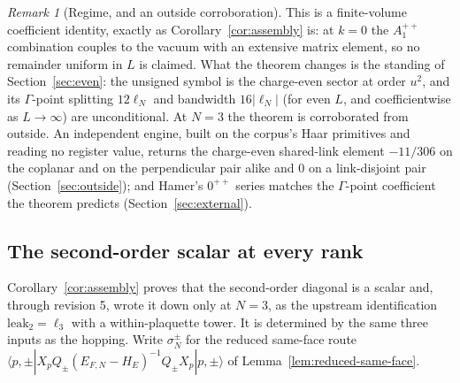 \documentclass[11pt]{article}
\theoremstyle{plain}
\theoremstyle{definition}
\theoremstyle{remark}
\newtheorem{remark}[theorem]{Remark}
\begin{document}
\begin{remark}[Regime, and an outside corroboration]
This is a finite-volume coefficient identity, exactly as
Corollary~\ref{cor:assembly} is: at $k=0$ the $A_1^{++}$ combination couples
to the vacuum with an extensive matrix element, so no remainder uniform in
$L$ is claimed. What the theorem changes is the standing of
Section~\ref{sec:even}: the unsigned symbol is the charge-even sector at
order $u^2$, and its $\Gamma$-point splitting $12\ell_N$ and bandwidth
$16|\ell_N|$ (for even $L$, and coefficientwise as $L\to\infty$) are
unconditional. At $N=3$ the theorem is corroborated from outside. An
independent engine, built on the corpus's Haar primitives and reading no
register value, returns the charge-even shared-link element $-11/306$ on the
coplanar and on the perpendicular pair alike and $0$ on a link-disjoint pair
(Section~\ref{sec:outside}); and Hamer's $0^{++}$ series matches the
$\Gamma$-point coefficient the theorem predicts (Section~\ref{sec:external}).
\end{remark}

\subsection{The second-order scalar at every rank}\label{sec:scalar}

Corollary~\ref{cor:assembly} proves that the second-order diagonal is a
scalar and, through revision 5, wrote it down only at $N=3$, as the upstream
identification $\mathrm{leak}_2=\ell_3$ with a within-plaquette tower. It is
determined by the same three inputs as the hopping. Write $\sigma^\pm_N$ for
the reduced same-face route
$\langle p,\pm|X_pQ_\pm(E_{F,N}-H_E)^{-1}Q_\pm X_p|p,\pm\rangle$ of
Lemma~\ref{lem:reduced-same-face}.
\end{document}
